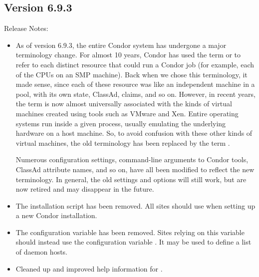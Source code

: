 \subsection*{\label{sec:New-6-9-3}Version 6.9.3}

\noindent Release Notes:

\begin{itemize}

\item As of version 6.9.3, the entire Condor system has undergone a
  major terminology change.
  For almost 10 years, Condor has used the term 
  or  to refer to each distinct resource that could run a
  Condor job (for example, each of the CPUs on an SMP machine).
  Back when we chose this terminology, it made sense, since each of
  these resource was like an independent machine in a pool, with
  its own state, ClassAd, claims, and so on.
  However, in recent years, the term  is now
  almost universally associated with the kinds of virtual machines
  created using tools such as VMware and Xen.  Entire operating systems
  run inside a given process, usually emulating the underlying
  hardware on a host machine.
  So, to avoid confusion with these other kinds of virtual machines,
  the old   terminology has been replaced by
  the term .

  Numerous configuration settings, command-line arguments to Condor
  tools, ClassAd attribute names, and so on, have all been
  modified to reflect the new  terminology.
  In general, the old settings and options will still work, but are
  now retired and may disappear in the future.

\item The  installation script has
  been removed.
  All sites should use  when setting up a new Condor
  installation.

\item The  configuration variable has
  been removed.
  Sites relying on this variable should instead use the configuration
  variable . It may be used to
  define a list of  daemon hosts.

\item Cleaned up and improved help information for .

\end{itemize}


